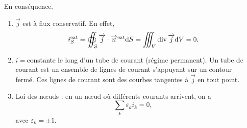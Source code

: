         En conséquence, 
        \begin{enumerate}[label=(\roman*)]
            \item $\vec{j}$ est à flux conservatif. En effet,
            \begin{equation*}
                i_S^{\text{ext}}=\oiint_{S}\protect\overrightarrow{{j}}\cdot\protect\overrightarrow{{n}}^{\text{ext}}\mathrm{d} S=\iiint_{V}\operatorname{div}\protect\overrightarrow{{j}}\mathrm{d} V=0.
            \end{equation*}
            \item $i=$constante le long d'un tube de courant (régime permanent). Un tube de courant est un ensemble de lignes de courant s'appuyant sur un contour fermé. Ces lignes de courant sont des courbes tangentes à $\vec{j}$ en tout point.
            \item Loi des n\oe uds : en un n\oe ud où différents courants arrivent, on a 
            \begin{equation*}
                \boxed{
                    \sum_{k}\varepsilon_{k}i_k=0,
                }
            \end{equation*}
            avec $\varepsilon_{k}=\pm1$.
        \end{enumerate}